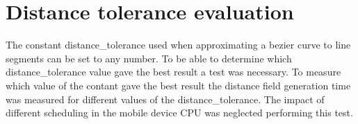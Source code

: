 \section{Distance tolerance evaluation}
The constant distance\_tolerance used when approximating a bezier curve to line segments can be set to any number. To be able to determine which distance\_tolerance value gave the best result a test was necessary. To measure which value of the contant gave the best result the distance field generation time was measured for different values of the distance\_tolerance. The impact of different scheduling in the mobile device CPU was neglected performing this test.

